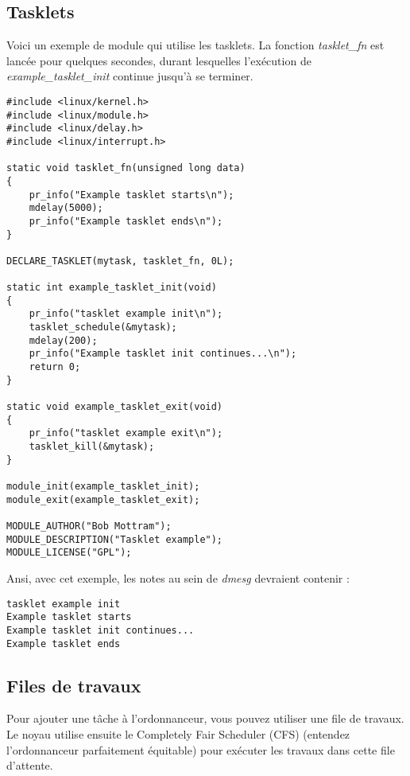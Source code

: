 \documentclass[11pt]{article}
\begin{document}
\subsection*{Tasklets}
\label{sec-14-1}

Voici un exemple de module qui utilise les tasklets. La fonction \emph{tasklet\_fn} est lancée pour quelques secondes, durant lesquelles l'exécution de \emph{example\_tasklet\_init} continue jusqu'à se terminer.

\begin{verbatim}
#include <linux/kernel.h>
#include <linux/module.h>
#include <linux/delay.h>
#include <linux/interrupt.h>

static void tasklet_fn(unsigned long data)
{
    pr_info("Example tasklet starts\n");
    mdelay(5000);
    pr_info("Example tasklet ends\n");
}

DECLARE_TASKLET(mytask, tasklet_fn, 0L);

static int example_tasklet_init(void)
{
    pr_info("tasklet example init\n");
    tasklet_schedule(&mytask);
    mdelay(200);
    pr_info("Example tasklet init continues...\n");
    return 0;
}

static void example_tasklet_exit(void)
{
    pr_info("tasklet example exit\n");
    tasklet_kill(&mytask);
}

module_init(example_tasklet_init);
module_exit(example_tasklet_exit);

MODULE_AUTHOR("Bob Mottram");
MODULE_DESCRIPTION("Tasklet example");
MODULE_LICENSE("GPL");
\end{verbatim}

Ansi, avec cet exemple, les notes au sein de \emph{dmesg} devraient contenir :

\begin{verbatim}
tasklet example init
Example tasklet starts
Example tasklet init continues...
Example tasklet ends
\end{verbatim}

\subsection*{Files de travaux}
\label{sec-14-2}

Pour ajouter une tâche à l'ordonnanceur, vous pouvez utiliser une file de travaux. Le noyau utilise ensuite le Completely Fair Scheduler (CFS) (entendez l'ordonnanceur parfaitement équitable) pour exécuter les travaux dans cette file d'attente.
\end{document}
